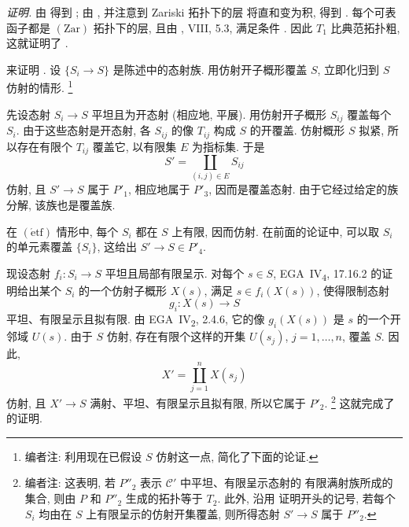 \smallskip
\noindent\textit{证明.}
由  得到
;
由 , 并注意到 Zariski 拓扑下的层
将直和变为积, 得到 .
每个可表函子都是 \((\mathrm{Zar})\) 拓扑下的层, 且由
, VIII, 5.3,
满足条件 .
因此 \(T_1\) 比典范拓扑粗, 这就证明了
.

来证明 .
设 \(\{S_i\to S\}\) 是陈述中的态射族.
用仿射开子概形覆盖 \(S\), 立即化归到 \(S\) 仿射的情形.
\footnote{编者注: 利用现在已假设 \(S\) 仿射这一点, 简化了下面的论证.}

先设态射 \(S_i\to S\) 平坦且为开态射 (相应地, 平展).
用仿射开子概形 \(S_{ij}\) 覆盖每个 \(S_i\).
由于这些态射是开态射, 各 \(S_{ij}\) 的像 \(T_{ij}\) 构成 \(S\) 的开覆盖.
仿射概形 \(S\) 拟紧, 所以存在有限个 \(T_{ij}\) 覆盖它,
以有限集 \(E\) 为指标集. 于是
\[
  S'=\coprod_{(i,j)\in E}S_{ij}
\]
仿射, 且 \(S'\to S\) 属于 \(P'_1\), 相应地属于 \(P'_3\),
因而是覆盖态射. 由于它经过给定的族分解, 该族也是覆盖族.

在 \((\mathrm{\acute etf})\) 情形中, 每个 \(S_i\) 都在 \(S\) 上有限,
因而仿射. 在前面的论证中, 可以取 \(S_i\) 的单元素覆盖 \(\{S_i\}\),
这给出 \(S'\to S\in P'_4\).

现设态射 \(f_i:S_i\to S\) 平坦且局部有限呈示.
对每个 \(s\in S\), EGA~IV\textsubscript{4}, 17.16.2 的证明给出某个 \(S_i\)
的一个仿射子概形 \(X(s)\), 满足 \(s\in f_i(X(s))\), 使得限制态射
\[
  g_i:X(s)\longrightarrow S
\]
平坦、有限呈示且拟有限. 由 EGA~IV\textsubscript{2}, 2.4.6,
它的像 \(g_i(X(s))\) 是 \(s\) 的一个开邻域 \(U(s)\).
由于 \(S\) 仿射, 存在有限个这样的开集 \(U(s_j)\), \(j=1,\ldots,n\),
覆盖 \(S\). 因此,
\[
  X'=\coprod_{j=1}^{n}X(s_j)
\]
仿射, 且 \(X'\to S\) 满射、平坦、有限呈示且拟有限, 所以它属于 \(P'_2\).
\footnote{编者注: 这表明, 若 \(P''_2\) 表示 \(\mathscr C'\) 中平坦、有限呈示态射的
有限满射族所成的集合, 则由 \(P\) 和 \(P''_2\) 生成的拓扑等于 \(T_2\).
此外, 沿用  证明开头的记号,
若每个 \(S_i\) 均由在 \(S\) 上有限呈示的仿射开集覆盖,
则所得态射 \(S'\to S\) 属于 \(P''_2\).}
这就完成了  的证明.

